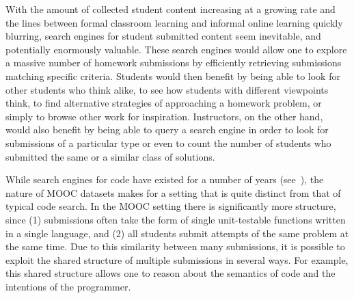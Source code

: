 With the amount of collected student content increasing at a growing rate
	and the lines between formal classroom learning and informal online learning quickly blurring, 
		search engines for student submitted content seem inevitable, and potentially enormously valuable. 
		These search engines would allow one to explore a massive number of homework submissions by efficiently retrieving submissions matching specific criteria.
Students would then benefit by being able to look for other students who think alike,
			 to see how students with different viewpoints think,
			to find alternative strategies of approaching a homework problem,
			or simply to browse other work for inspiration.
Instructors, on the other hand, would also benefit %
by being able to query a search engine in order to look for submissions of a particular
			type or even to count the number of students who submitted the same
			or a similar class of solutions.

 While search engines for code have existed for a number of years (see~\cite{paul94,thummalapenta07,hummel08,kim10}),
the nature of MOOC datasets makes for a setting that is quite distinct from that of typical code search.
In the MOOC setting there is significantly more structure, since
(1)  submissions often take the form of single unit-testable functions written in a single language, and (2) 
all students submit attempts of the same problem at the same time.   
Due to this similarity between many submissions, 
it is possible to exploit the shared structure of multiple submissions in several ways.
For example, this shared structure allows one to reason about the
semantics of code and the intentions of the programmer.   


